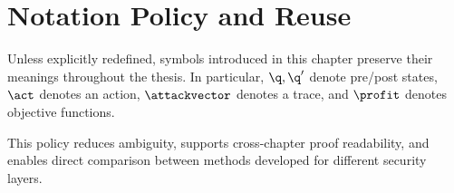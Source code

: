 \section{Notation Policy and Reuse}

Unless explicitly redefined, symbols introduced in this chapter preserve their meanings throughout the thesis.
In particular, $\q,\q'$ denote pre/post states, $\act$ denotes an action,
$\attackvector$ denotes a trace, and $\profit$ denotes objective functions.

This policy reduces ambiguity, supports cross-chapter proof readability,
and enables direct comparison between methods developed for different security layers.
